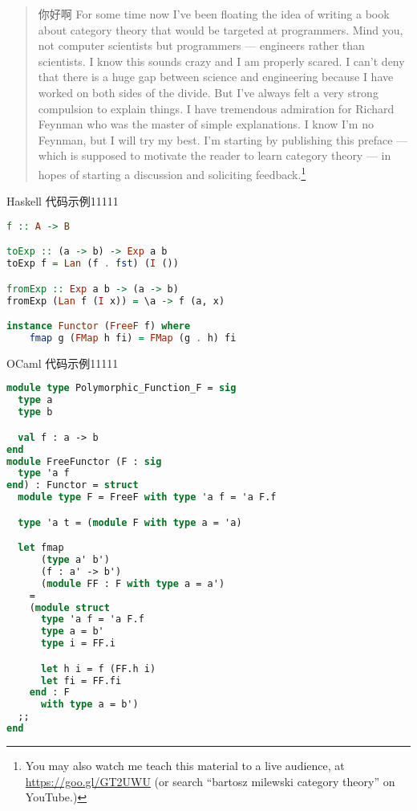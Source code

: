 
\begin{quote}
  你好啊
  For some time now I've been floating the idea of writing a book about
  category theory that would be targeted at programmers. Mind you, not
  computer scientists but programmers --- engineers rather than
  scientists. I know this sounds crazy and I am properly scared. I can't
  deny that there is a huge gap between science and engineering because I
  have worked on both sides of the divide. But I've always felt a very
  strong compulsion to explain things. I have tremendous admiration for
  Richard Feynman who was the master of simple explanations. I know I'm no
  Feynman, but I will try my best. I'm starting by publishing this preface
  --- which is supposed to motivate the reader to learn category theory
  --- in hopes of starting a discussion and soliciting feedback.\footnote{
    You may also watch me teach this material to a live audience, at
    \href{https://goo.gl/GT2UWU}{https://goo.gl/GT2UWU} (or search
    ``bartosz milewski category theory'' on YouTube.)}
\end{quote}

{Haskell 代码示例11111}
\begin{lstlisting}[language=Haskell]
f :: A -> B

toExp :: (a -> b) -> Exp a b
toExp f = Lan (f . fst) (I ())

fromExp :: Exp a b -> (a -> b)
fromExp (Lan f (I x)) = \a -> f (a, x)

instance Functor (FreeF f) where
    fmap g (FMap h fi) = FMap (g . h) fi
\end{lstlisting}

{OCaml 代码示例11111}
\begin{lstlisting}[language=Caml]
module type Polymorphic_Function_F = sig
  type a
  type b

  val f : a -> b
end
module FreeFunctor (F : sig
  type 'a f
end) : Functor = struct
  module type F = FreeF with type 'a f = 'a F.f

  type 'a t = (module F with type a = 'a)

  let fmap
      (type a' b')
      (f : a' -> b')
      (module FF : F with type a = a')
    =
    (module struct
      type 'a f = 'a F.f
      type a = b'
      type i = FF.i

      let h i = f (FF.h i)
      let fi = FF.fi
    end : F
      with type a = b')
  ;;
end

\end{lstlisting}


